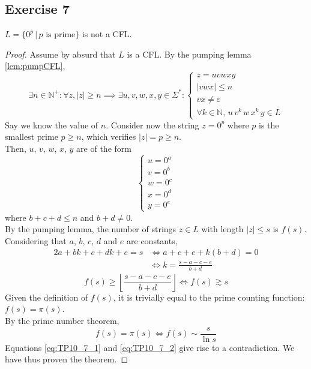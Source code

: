 {\subsection{Exercise 7}
\begin{theorem}
	$L=\{0^p\,|\,p \text{ is prime}\}$ is not a CFL.
\end{theorem}
\begin{proof}
Assume by absurd that $L$ is a CFL. By the pumping lemma \eqref{lem:pumpCFL},
\begin{equation*}
	\exists n \in \mathbb{N}^+ \colon \forall z, |z|\geq n \implies \exists u, v, w, x, y \in \Sigma^* \colon 
	\begin{cases}
		z=uvwxy\\
		|vwx| \leq n\\
		vx \neq \varepsilon \\
		\forall k \in \mathbb{N},\,u\,v^k\,w\,x^k\,y \in L
	\end{cases}
\end{equation*}
Say we know the value of $n$. Consider now the string $z=0^p$ where $p$ is the smallest prime $p\geq n$, which verifies $|z|=p \geq n$.\\
Then, $u$, $v$, $w$, $x$, $y$ are of the form
\begin{equation*}
	\begin{cases}
		u=0^a\\
		v=0^b\\
		w=0^c\\
		x=0^d\\
		y=0^e
	\end{cases}
\end{equation*}
where $b+c+d \leq n$ and $b+d \neq 0$.\\
By the pumping lemma, the number of strings $z\in L$ with length $|z|\leq s$ is $f(s)$.
Considering that $a$, $b$, $c$, $d$ and $e$ are constants,
\begin{alignat*}{2}
	a+bk+c+dk+e=s
	&\iff a+c+e+k(b+d)=0\\
	&\iff k           =\frac{s-a-c-e}{b+d}
\end{alignat*}
\begin{equation} \label{eq:TP10_7_1}
	f(s) \geq \left\lfloor \frac{s-a-c-e}{b+d} \right\rfloor \iff f(s) \gtrsim s
\end{equation}
Given the definition of $f(s)$, it is trivially equal to the prime counting function: $f(s)=\pi(s)$.\\
By the prime number theorem,
\begin{equation} \label{eq:TP10_7_2}
	f(s) = \pi(s) \iff f(s) \sim \frac{s}{\ln{s}}
\end{equation}
Equations \eqref{eq:TP10_7_1} and \eqref{eq:TP10_7_2} give rise to a contradiction. We have thus proven the theorem.
\end{proof}
\pagebreak
}
